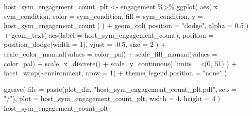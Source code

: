 \documentclass[
]{book}
\newenvironment{Shaded}{\begin{snugshade}}{\end{snugshade}}
\newcommand{\AttributeTok}[1]{\textcolor[rgb]{0.77,0.63,0.00}{#1}}
\newcommand{\DecValTok}[1]{\textcolor[rgb]{0.00,0.00,0.81}{#1}}
\newcommand{\FloatTok}[1]{\textcolor[rgb]{0.00,0.00,0.81}{#1}}
\newcommand{\FunctionTok}[1]{\textcolor[rgb]{0.00,0.00,0.00}{#1}}
\newcommand{\NormalTok}[1]{#1}
\newcommand{\OtherTok}[1]{\textcolor[rgb]{0.56,0.35,0.01}{#1}}
\newcommand{\SpecialCharTok}[1]{\textcolor[rgb]{0.00,0.00,0.00}{#1}}
\newcommand{\StringTok}[1]{\textcolor[rgb]{0.31,0.60,0.02}{#1}}
\begin{document}
\begin{Shaded}
\begin{Highlighting}[]
\NormalTok{host\_sym\_engagement\_count\_plt }\OtherTok{\textless{}{-}}\NormalTok{ engagement }\SpecialCharTok{\%\textgreater{}\%}
  \FunctionTok{ggplot}\NormalTok{(}
    \FunctionTok{aes}\NormalTok{(}
      \AttributeTok{x =}\NormalTok{ sym\_condition,}
      \AttributeTok{color =}\NormalTok{ sym\_condition,}
      \AttributeTok{fill =}\NormalTok{ sym\_condition,}
      \AttributeTok{y =}\NormalTok{ host\_sym\_engagement\_count}
\NormalTok{    )}
\NormalTok{  ) }\SpecialCharTok{+}
  \FunctionTok{geom\_col}\NormalTok{(}
    \AttributeTok{position =} \StringTok{"dodge"}\NormalTok{,}
    \AttributeTok{alpha =} \FloatTok{0.5}
\NormalTok{  ) }\SpecialCharTok{+}
  \FunctionTok{geom\_text}\NormalTok{(}
    \FunctionTok{aes}\NormalTok{(}\AttributeTok{label =}\NormalTok{ host\_sym\_engagement\_count),}
    \AttributeTok{position =} \FunctionTok{position\_dodge}\NormalTok{(}\AttributeTok{width =} \DecValTok{1}\NormalTok{),}
    \AttributeTok{vjust =} \SpecialCharTok{{-}}\FloatTok{0.5}\NormalTok{,}
    \AttributeTok{size =} \DecValTok{2}
\NormalTok{  ) }\SpecialCharTok{+}
  \FunctionTok{scale\_color\_manual}\NormalTok{(}\AttributeTok{values =}\NormalTok{ color\_pal) }\SpecialCharTok{+}
  \FunctionTok{scale\_fill\_manual}\NormalTok{(}\AttributeTok{values =}\NormalTok{ color\_pal) }\SpecialCharTok{+}
  \FunctionTok{scale\_x\_discrete}\NormalTok{() }\SpecialCharTok{+}
  \FunctionTok{scale\_y\_continuous}\NormalTok{(}
    \AttributeTok{limits =} \FunctionTok{c}\NormalTok{(}\DecValTok{0}\NormalTok{, }\DecValTok{51}\NormalTok{)}
\NormalTok{  ) }\SpecialCharTok{+}
  \FunctionTok{facet\_wrap}\NormalTok{(}\SpecialCharTok{\textasciitilde{}}\NormalTok{environment, }\AttributeTok{nrow =} \DecValTok{1}\NormalTok{) }\SpecialCharTok{+}
  \FunctionTok{theme}\NormalTok{(}
    \AttributeTok{legend.position =} \StringTok{"none"}
\NormalTok{  )}

\FunctionTok{ggsave}\NormalTok{(}
  \AttributeTok{file =} \FunctionTok{paste}\NormalTok{(plot\_dir, }\StringTok{"host\_sym\_engagement\_count\_plt.pdf"}\NormalTok{, }\AttributeTok{sep =} \StringTok{"/"}\NormalTok{),}
  \AttributeTok{plot =}\NormalTok{ host\_sym\_engagement\_count\_plt,}
  \AttributeTok{width =} \DecValTok{4}\NormalTok{,}
  \AttributeTok{height =} \DecValTok{4}
\NormalTok{)}
\NormalTok{host\_sym\_engagement\_count\_plt}
\end{Highlighting}
\end{Shaded}
\end{document}
